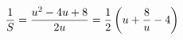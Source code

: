 \documentclass[preview]{standalone}
\begin{document}
\begin{align*}
\special{dvisvgm:raw <g id='unique000'>}\frac{1}{S}=\frac{u^2-4u+8}{2u}=\frac{1}{2}\left(u+\frac{8}{u}-4\right)\special{dvisvgm:raw </g>}
\end{align*}
\end{document}
